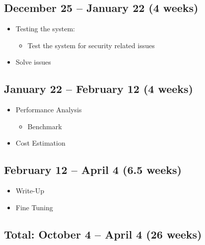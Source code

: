 \documentclass[a4paper, 11pt]{article}
\begin{document}
\subsection*{December 25 -- January 22 (4 weeks)}
\begin{itemize}
    \item Testing the system: 
    \begin{itemize}
        \item Test the system for security related issues
    \end{itemize}
    \item Solve issues
\end{itemize}

\subsection*{January 22 -- February 12 (4 weeks)}
\begin{itemize}
    \item Performance Analysis
    \begin{itemize}
        \item Benchmark
    \end{itemize}
    
    \item Cost Estimation
\end{itemize}

\subsection*{February 12 -- April 4 (6.5 weeks)}
\begin{itemize}
    \item Write-Up
    \item Fine Tuning
\end{itemize}


\subsection*{Total: October 4 -- April 4 (26 weeks)}
\end{document}
